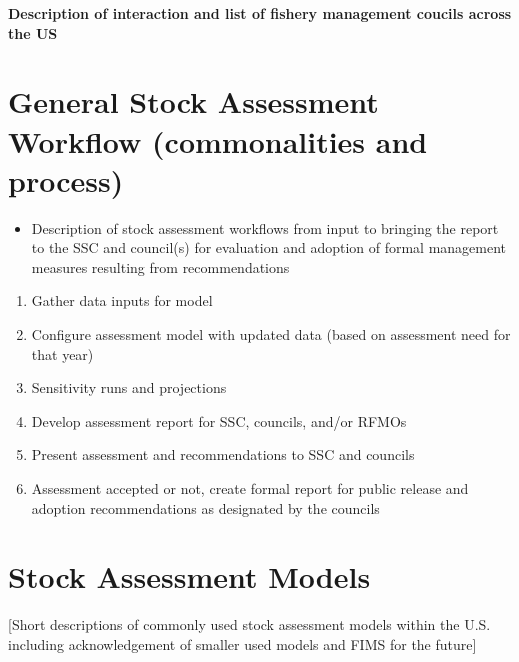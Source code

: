 \documentclass[
  letterpaper,
  DIV=11,
  numbers=noendperiod]{scrreprt}
\providecommand{\tightlist}{%
  \setlength{\itemsep}{0pt}\setlength{\parskip}{0pt}}\usepackage{longtable,booktabs,array}
\begin{document}
\textbf{Description of interaction and list of fishery management
coucils across the US}


\chapter{General Stock Assessment Workflow (commonalities and
process)}\label{sec-general}

\begin{itemize}
\tightlist
\item
  Description of stock assessment workflows from input to bringing the
  report to the SSC and council(s) for evaluation and adoption of formal
  management measures resulting from recommendations
\end{itemize}

\begin{enumerate}
\def\labelenumi{\arabic{enumi}.}
\item
  Gather data inputs for model
\item
  Configure assessment model with updated data (based on assessment need
  for that year)
\item
  Sensitivity runs and projections
\item
  Develop assessment report for SSC, councils, and/or RFMOs
\item
  Present assessment and recommendations to SSC and councils
\item
  Assessment accepted or not, create formal report for public release
  and adoption recommendations as designated by the councils
\end{enumerate}


\chapter{Stock Assessment Models}\label{stock-assessment-models}

{[}Short descriptions of commonly used stock assessment models within
the U.S. including acknowledgement of smaller used models and FIMS for
the future{]}
\end{document}

